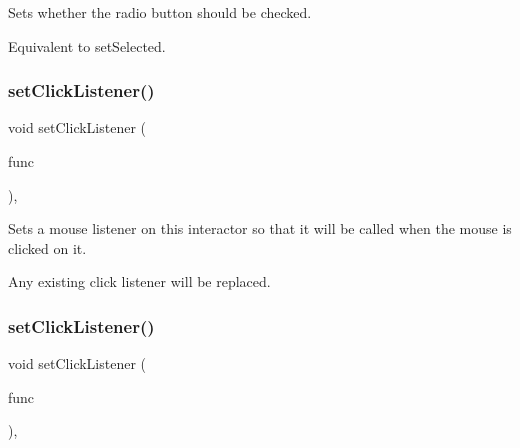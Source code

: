 Sets whether the radio button should be checked. 

Equivalent to set\+Selected. \mbox{\label{classsgl_1_1GInteractor_abd40af6921242584d0954f173911b190}} 
\subsubsection{\texorpdfstring{set\+Click\+Listener()}{setClickListener()}\hspace{0.1cm}{\footnotesize\ttfamily [1/2]}}
{\footnotesize\ttfamily void set\+Click\+Listener (\begin{DoxyParamCaption}\item[{\mbox{\hyperlink{namespacesgl_ae9f3e9eab70035da1a2b114e21357b25}{G\+Event\+Listener}}}]{func }\end{DoxyParamCaption})\hspace{0.3cm}{\ttfamily [virtual]}, {\ttfamily [inherited]}}



Sets a mouse listener on this interactor so that it will be called when the mouse is clicked on it. 

Any existing click listener will be replaced. \mbox{\label{classsgl_1_1GInteractor_a856414c92df90f56f3877475eb3f8fc4}} 
\subsubsection{\texorpdfstring{set\+Click\+Listener()}{setClickListener()}\hspace{0.1cm}{\footnotesize\ttfamily [2/2]}}
{\footnotesize\ttfamily void set\+Click\+Listener (\begin{DoxyParamCaption}\item[{\mbox{\hyperlink{namespacesgl_a54427ce97bb1c2804e4fe2b0a62e8b17}{G\+Event\+Listener\+Void}}}]{func }\end{DoxyParamCaption})\hspace{0.3cm}{\ttfamily [virtual]}, {\ttfamily [inherited]}}



